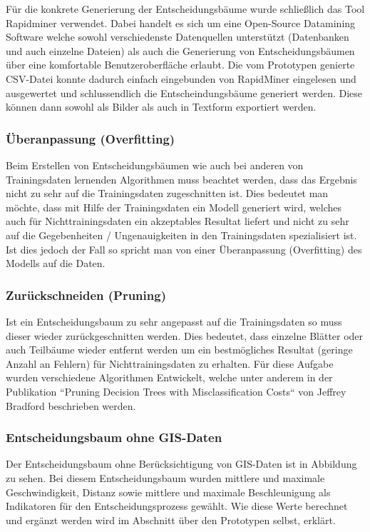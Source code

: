 Für die konkrete Generierung der Entscheidungsbäume wurde schließlich das Tool Rapidminer verwendet. Dabei handelt es sich um eine Open-Source Datamining Software welche sowohl verschiedenste Datenquellen unterstützt (Datenbanken und auch einzelne Dateien) als auch die Generierung von Entscheidungsbäumen über eine komfortable Benutzeroberfläche erlaubt. Die vom Prototypen genierte CSV-Datei konnte dadurch einfach eingebunden von RapidMiner eingelesen und ausgewertet und schlussendlich die Entscheindungsbäume generiert werden. Diese können dann sowohl als Bilder als auch in Textform exportiert werden.

\subsubsection{Überanpassung (Overfitting)}
Beim Erstellen von Entscheidungsbäumen wie auch bei anderen von Trainingsdaten lernenden Algorithmen muss beachtet werden, dass das Ergebnis nicht zu sehr auf die Trainingsdaten zugeschnitten ist. Dies bedeutet man möchte, dass mit Hilfe der Trainingsdaten ein Modell generiert wird, welches auch für Nichttrainingsdaten ein akzeptables Resultat liefert und nicht zu sehr auf die Gegebenheiten / Ungenauigkeiten in den Trainingsdaten spezialisiert ist. Ist dies jedoch der Fall so spricht man von einer Überanpassung (Overfitting) des Modells auf die Daten.  \cite{tom_dietterich_overfitting_1995}

\subsubsection{Zurückschneiden (Pruning)}
Ist ein Entscheidungsbaum zu sehr angepasst auf die Trainingsdaten so muss dieser wieder zurückgeschnitten werden. Dies bedeutet, dass einzelne Blätter oder auch Teilbäume wieder entfernt werden um ein bestmögliches Resultat (geringe Anzahl an Fehlern) für Nichttrainingsdaten zu erhalten. Für diese Aufgabe wurden verschiedene Algorithmen Entwickelt, welche unter anderem in der Publikation ``Pruning Decision Trees with Misclassification Costs`` von Jeffrey Bradford beschrieben werden. \cite{jeffrey_p._bradford_pruning_1998}

\subsubsection{Entscheidungsbaum ohne GIS-Daten}
\label{entscheidungsbaum}
Der Entscheidungsbaum ohne Berücksichtigung von GIS-Daten ist in Abbildung  zu sehen. Bei diesem Entscheidungsbaum wurden mittlere und maximale Geschwindigkeit, Distanz sowie mittlere und maximale Beschleunigung als Indikatoren für den Entscheidungsprozess gewählt. Wie diese Werte berechnet und ergänzt werden wird im Abschnitt über den Prototypen selbst, erklärt. 

